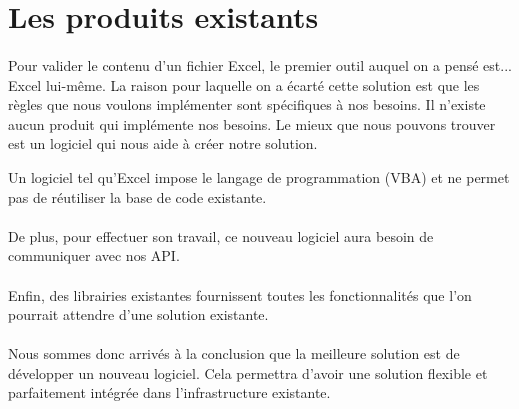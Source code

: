 \section{Les produits existants}
\label{sec:existing-products}

\paragraph{}
Pour valider le contenu d'un fichier Excel, le premier outil auquel on a pensé est... Excel lui-même.
La raison pour laquelle on a écarté cette solution est que les règles que nous voulons implémenter sont spécifiques à nos besoins.
Il n'existe aucun produit qui implémente nos besoins.
Le mieux que nous pouvons trouver est un logiciel qui nous aide à créer notre solution.

Un logiciel tel qu’Excel impose le langage de programmation (VBA) et ne permet pas de réutiliser la base de code existante.

\paragraph{}
De plus, pour effectuer son travail, ce nouveau logiciel aura besoin de communiquer avec nos API.

\paragraph{}
Enfin, des librairies existantes fournissent toutes les fonctionnalités que l'on pourrait attendre d'une solution existante.

\paragraph{}
Nous sommes donc arrivés à la conclusion que la meilleure solution est de développer un nouveau logiciel.
Cela permettra d'avoir une solution flexible et parfaitement intégrée dans l'infrastructure existante.
